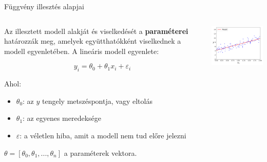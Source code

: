 \documentclass[english, aspectratio=169]{beamer}
\begin{document}
\begin{frame}{Függvény illesztés alapjai}
\begin{columns}
\begin{column}{.5\textwidth}
Az illesztett modell alakját és viselkedését a \textbf{paraméterei} határozzák meg, amelyek együtthatókként viselkednek a modell egyenletében. A lineáris modell egyenlete: 
\begin{block}{}
\vspace{-0.25cm}
\[
y_i = \theta_0 + \theta_1x_i + \varepsilon_i
\]
\end{block}
Ahol:
\begin{itemize}
	\item $\theta_0$: az $y$ tengely metszéspontja, vagy eltolás
	\item $\theta_1$: az egyenes meredeksége
	\item $\varepsilon$: a véletlen hiba, amit a modell nem tud előre jelezni
\end{itemize}
$\theta=[\theta_0,\theta_1,...,\theta_n]$ a paraméterek vektora.
\end{column}
\begin{column}{.5\textwidth}
\begin{center}
\includegraphics[width=7cm, keepaspectratio]{images/ql_9.png}
\end{center}
\end{column}
\end{columns}
\end{frame}
\end{document}
